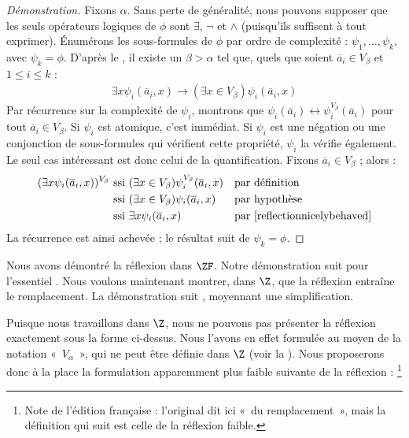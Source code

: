 \documentclass[../../../include/open-logic-section]{subfiles}
\begin{document}
\begin{proof}[Démonstration]
Fixons $\alpha$. Sans perte de généralité, nous pouvons
supposer que les seuls opérateurs logiques de $\phi$ sont
$\exists$, $\lnot$ et $\land$ (puisqu'ils suffisent
à tout exprimer). Énumérons les sous-formules de $\phi$
par ordre de complexité : $\psi_1, \ldots, \psi_k$,
avec $\psi_k = \phi$. D'après le ,
il existe un $\beta > \alpha$ tel que, quels que soient
$\overline{a}_i \in V_\beta$ et $1 \leq i \leq k$ :
\begin{align}\label{reflectionnicelybehaved}
	\exists x\psi_i(\overline{a}_i, x) \rightarrow
	(\exists x \in V_\beta) \psi_i(\overline{a}_i, x)\tag{*}
\end{align}
Par récurrence sur la complexité de $\psi_i$, montrons que
$\psi_i(\overline{a}_i) \leftrightarrow
\psi_i^{V_\beta}(\overline{a}_i)$ pour tout
$\overline{a}_i \in V_\beta$. Si $\psi_i$ est atomique,
c'est immédiat. Si $\psi_i$ est une négation ou une
conjonction de sous-formules qui vérifient cette
propriété, $\psi_i$ la vérifie également.
Le seul cas intéressant est donc celui de
la quantification. Fixons
$\overline{a}_i \in V_\beta$ ; alors :
\begin{align*}
	(\exists x \psi_i(\overline{a}_i, x))^{V_\beta}
	&\text{ ssi }
	(\exists x \in V_\beta)\psi_i^{V_\beta}(\overline{a}_i, x)
	&&\text{par définition}\\
	&\text{ ssi }
	(\exists x \in V_\beta)\psi_i(\overline{a}_i,  x)
	&&\text{par hypothèse}\\
	&\text{ ssi }
	\exists x \psi_i(\overline{a}_i, x)
	&&\text{par \eqref{reflectionnicelybehaved}}
\end{align*}
La récurrence est ainsi achevée ; le résultat suit de
$\psi_k = \phi$.
\end{proof}

Nous avons démontré la réflexion dans $\ZF$.
Notre démonstration suit pour l'essentiel
\citet{Montague1961}. Nous voulons maintenant
montrer, dans $\Z$, que la réflexion entraîne
le remplacement. La démonstration suit
\citet{Levy1960}, moyennant une simplification.

Puisque nous travaillons dans $\Z$, nous ne pouvons
pas présenter la réflexion exactement sous la forme
ci-dessus. Nous l'avons en effet formulée au moyen de
la notation «~$V_\alpha$~», qui ne peut être définie
dans $\Z$ (voir la ).
Nous proposerons donc à la place la formulation
apparemment plus faible suivante de la réflexion :
\footnote{Note de l'édition française : l'original dit ici
«~du remplacement~», mais la définition qui suit est celle
de la réflexion faible.}
\end{document}
